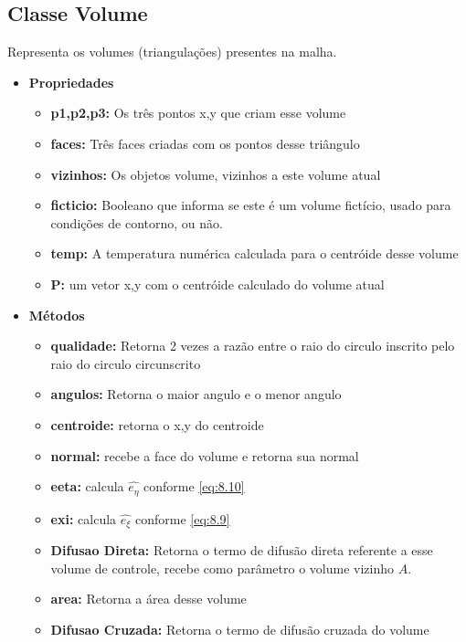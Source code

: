 \subsection{Classe Volume}
Representa os volumes (triangulações) presentes na malha.

\begin{itemize}
    \item \textbf{Propriedades}
    \begin{itemize}
        \item \textbf{p1,p2,p3:} Os três pontos x,y que criam esse volume
        \item \textbf{faces:} Três faces criadas com os pontos desse triângulo
        \item \textbf{vizinhos:} Os objetos volume, vizinhos a este volume atual
        \item \textbf{ficticio:} Booleano que informa se este é um volume fictício, usado para condições de contorno, ou não.
        \item \textbf{temp:} A temperatura numérica calculada para o centróide desse volume
        \item \textbf{P:} um vetor x,y com o centróide calculado do volume atual
    \end{itemize}
    \item \textbf{Métodos}
    \begin{itemize}
        \item \textbf{qualidade:} Retorna 2 vezes a razão entre o raio do circulo inscrito pelo raio do circulo circunscrito
        \item \textbf{angulos:} Retorna o maior angulo e o menor angulo
        \item \textbf{centroide:} retorna o x,y do centroide
        \item \textbf{normal:} recebe a face do volume e retorna sua normal
        \item \textbf{eeta:} calcula $\hat{e_\eta}$ conforme \ref{eq:8.10}
        \item \textbf{exi:} calcula $\hat{e_\xi}$ conforme \ref{eq:8.9}
        \item \textbf{Difusao Direta:} Retorna o termo de difusão direta referente a esse volume de controle, recebe como parâmetro o volume vizinho $A$.
        \item \textbf{area:} Retorna a área desse volume
        \item \textbf{Difusao Cruzada:} Retorna o termo de difusão cruzada do volume
    \end{itemize}
\end{itemize}


